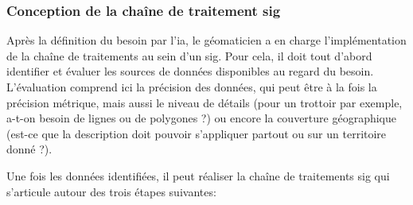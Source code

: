 \subsubsection{Conception de la chaîne de traitement \gls{sig}}

\label{sec:conception_chaine_sig}

Après la définition du besoin par l’\gls{ia}, le géomaticien a en charge l’implémentation de la chaîne de traitements au sein d’un \gls{sig}. Pour cela, il doit tout d’abord identifier et évaluer les sources de données disponibles au regard du besoin. L’évaluation comprend ici la précision des données, qui peut être à la fois la précision métrique, mais aussi le niveau de détails (pour un trottoir par exemple, a-t-on besoin de lignes ou de polygones ?) ou encore la couverture géographique (est-ce que la description doit pouvoir s’appliquer partout ou sur un territoire donné ?).

\newpar{}

Une fois les données identifiées, il peut réaliser la chaîne de traitements \gls{sig} qui s’articule autour des trois étapes suivantes:


